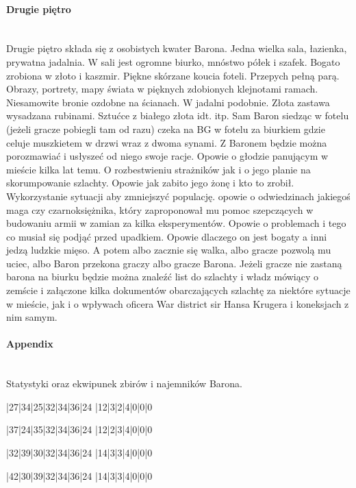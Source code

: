 \documentclass{article}
\newcommand{\paragraphx}[1]{
    \paragraph{\Large{{#1}}}\mbox{}\\
}
\begin{document}
\paragraph{\Large{Drugie piętro}}\mbox{}\\

Drugie piętro składa się z osobistych kwater Barona. Jedna wielka sala, łazienka, prywatna jadalnia. W sali jest ogromne biurko, mnóstwo półek i szafek. Bogato zrobiona w złoto i kaszmir. Piękne skórzane koucia foteli. Przepych pełną parą. Obrazy, portrety, mapy świata w pięknych zdobionych klejnotami ramach. Niesamowite bronie ozdobne na ścianach. W jadalni podobnie. Złota zastawa wysadzana rubinami. Sztućce z białego złota idt. itp. Sam Baron siedząc w fotelu (jeżeli gracze pobiegli tam od razu) czeka na BG w fotelu za biurkiem gdzie celuje muszkietem w drzwi wraz z dwoma synami. Z Baronem będzie można porozmawiać i usłyszeć od niego swoje racje. Opowie o głodzie panującym w mieście kilka lat temu. O rozbestwieniu strażników jak i o jego planie na skorumpowanie szlachty. Opowie jak zabito jego żonę i kto to zrobił. Wykorzystanie sytuacji aby zmniejszyć populację. opowie o odwiedzinach jakiegoś maga czy czarnoksiężnika, który zaproponował mu pomoc szepczących w budowaniu armii w zamian za kilka eksperymentów. Opowie o problemach i tego co musiał się podjąć przed upadkiem. Opowie dlaczego on jest bogaty a inni jedzą ludzkie mięso. A potem albo zacznie się walka, albo gracze pozwolą mu uciec, albo Baron przekona graczy albo gracze Barona. Jeżeli gracze nie zastaną barona na biurku będzie można znaleźć list do szlachty i władz mówiący o zemście i załączone kilka dokumentów obarczających szlachtę za niektóre sytuacje w mieście, jak i o wpływach oficera War district sir Hansa Krugera i koneksjach z nim samym.



\pagebreak
\centering
\paragraphx{Appendix}
Statystyki oraz ekwipunek zbirów i najemników Barona.
\raggedright

\startwhtable[Zbir]
|27|34|25|32|34|36|24
|12|3|2|4|0|0|0
\stopwhtable

\startwhtable[Zbir 2]
|37|24|35|32|34|36|24
|12|2|3|4|0|0|0
\stopwhtable

\startwhtable[Zbir 3]
|32|39|30|32|34|36|24
|14|3|3|4|0|0|0
\stopwhtable

\startwhtable[Zbir 4]
|42|30|39|32|34|36|24
|14|3|3|4|0|0|0
\stopwhtable
\end{document}
